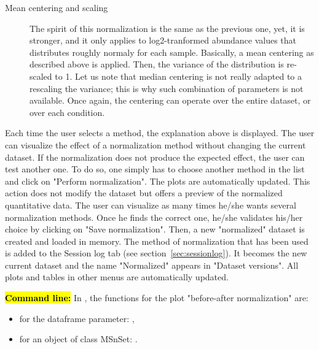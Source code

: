 \documentclass[12pt]{article}
\begin{document}
\begin {description}
    \item[Mean centering and scaling] The spirit of this normalization is the same as the previous one, yet, it is stronger, and it only applies to log2-tranformed abundance values that distributes roughly normaly for each sample. Basically, a mean centering as described above is applied. Then, the variance of the distribution is re-scaled to 1. Let us note that median centering is not really adapted to a rescaling the variance; this is why such combination of parameters is not available. Once again, the centering can operate over the entire dataset, or over each condition.
\end {description}

Each time the user selects a method, the explanation above is displayed. The user can visualize the effect of a normalization method without changing the current dataset. If the normalization does not produce the expected effect, the user can test another one. To do so, one simply has to choose another method in the list and click on "Perform normalization". The plots are automatically updated. This action does not modify the dataset but offers a preview of the normalized quantitative data.
The user can visualize as many times he/she wants several normalization methods. Once he finds the correct one, he/she validates his/her choice by clicking on "Save normalization". Then, a new "normalized" dataset is created and loaded in memory. The method of normalization that has been used is added to the Session log tab (see section~\ref{sec:sessionlog}). It becomes the new current dataset and the name "Normalized" appears in "Dataset versions". All plots and tables in other menus are automatically updated.

{\hl{\bf Command line:} In , the functions for the plot "before-after normalization" are:
\begin{itemize}
\item for the dataframe parameter:  ,
\item for an object of class MSnSet:  .
\end{itemize}}
\end{document}
